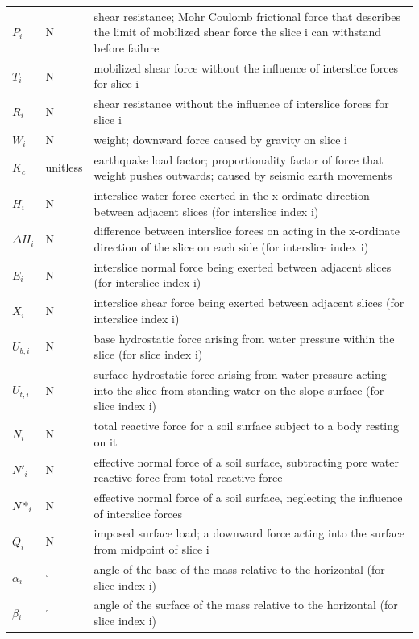 \documentclass[12pt]{article}
\begin{document}
\begin{longtable*}{l l l}
\\
$P_{i}$ & N & shear resistance; Mohr Coulomb frictional force that describes the limit of mobilized shear force the slice i can withstand before failure
\\
$T_{i}$ & N & mobilized shear force without the influence of interslice forces for slice i
\\
$R_{i}$ & N & shear resistance without the influence of interslice forces for slice i
\\
$W_{i}$ & N & weight; downward force caused by gravity on slice i
\\
$K_{c}$ & unitless & earthquake load factor; proportionality factor of force that weight pushes outwards; caused by seismic earth movements
\\
$H_{i}$ & N & interslice water force exerted in the x-ordinate direction between adjacent slices (for interslice index i)
\\
$\Delta{}H_{i}$ & N & difference between interslice forces on acting in the x-ordinate direction of the slice on each side (for interslice index i)
\\
$E_{i}$ & N & interslice normal force being exerted between adjacent slices (for interslice index i)
\\
$X_{i}$ & N & interslice shear force being exerted between adjacent slices (for interslice index i)
\\
$U_{b,i}$ & N & base hydrostatic force arising from water pressure within the slice (for slice index i)
\\
$U_{t,i}$ & N & surface hydrostatic force arising from water pressure acting into the slice from standing water on the slope surface (for slice index i)
\\
$N_{i}$ & N & total reactive force for a soil surface subject to a body resting on it
\\
$N'_{i}$ & N & effective normal force of a soil surface, subtracting pore water reactive force from total reactive force
\\
$N*_{i}$ & N & effective normal force of a soil surface, neglecting the influence of interslice forces
\\
$Q_{i}$ & N & imposed surface load; a downward force acting into the surface from midpoint of slice i
\\
$\alpha{}_{i}$ & ${}^{\circ}$ & angle of the base of the mass relative to the horizontal (for slice index i)
\\
$\beta{}_{i}$ & ${}^{\circ}$ & angle of the surface of the mass relative to the horizontal (for slice index i)

\end{longtable*}
\end{document}
